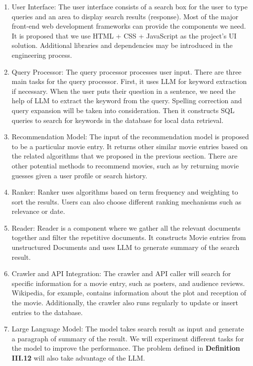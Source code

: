 \documentclass[journal]{IEEEtran}
\theoremstyle{mydefstyle}
\begin{document}
\begin{enumerate}
    \item  {User Interface}: The user interface consists of a search box for the user to type queries and an area to display search results (response). Most of the major front-end web development frameworks can provide the components we need. It is proposed that we use HTML + CSS + JavaScript as the project’s UI solution. Additional libraries and dependencies may be introduced in the engineering process.

    \item {Query Processor}: The query processor processes user input. There are three main tasks for the query processor. First, it uses LLM for keyword extraction if necessary. When the user puts their question in a sentence, we need the help of LLM to extract the keyword from the query. Spelling correction and query expansion will be taken into consideration. Then it constructs SQL queries to search for keywords in the database for local data retrieval.

    \item {Recommendation Model}: The input of the recommendation model is proposed to be a particular movie entry. It returns other similar movie entries based on the related algorithms that we proposed in the previous section. There are other potential methods to recommend movies, such as by returning movie guesses given a user profile or search history.

    \item {Ranker}: Ranker uses algorithms based on term frequency and weighting to sort the results. Users can also choose different ranking mechanisms such as relevance or date.

    \item {Reader}: Reader is a component where we gather all the relevant documents together and filter the repetitive documents. It constructs Movie entries from unstructured Documents and uses LLM to generate summary of the search result.

    \item {Crawler and API Integration}: The crawler and API caller will search for specific information for a movie entry, such as posters, and audience reviews. Wikipedia, for example, contains information about the plot and reception of the movie. Additionally, the crawler also runs regularly to update or insert entries to the database.

    \item {Large Language Model}: The model takes search result as input and generate a paragraph of summary of the result. We will experiment different tasks for the model to improve the performance. The problem defined in \textbf{Definition III.12} will also take advantage of the LLM.
\end{enumerate}
\end{document}
